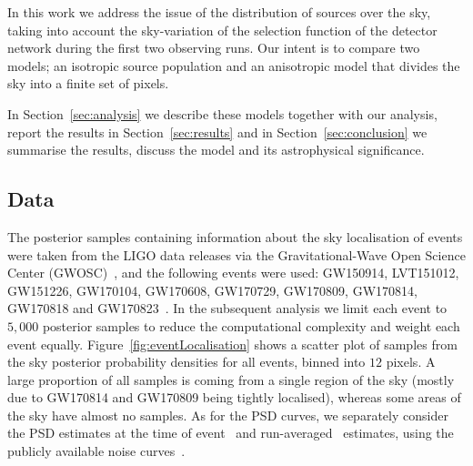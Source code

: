 \documentclass[usenatbib,useAMS]{mnras}
\begin{document}
In this work we address the issue of the distribution of sources over the sky,
taking into account the sky-variation of the selection function of the detector
network during the first two observing runs. Our intent is to compare two
models; an isotropic source population and an anisotropic model that divides the
sky into a finite set of pixels.

In Section~\ref{sec:analysis} we describe these
models together with our analysis, report the results in
Section~\ref{sec:results} and in Section~\ref{sec:conclusion} we summarise the
results, discuss the model and its astrophysical significance.

\subsection{Data}
The posterior samples containing information about the sky localisation of
events were taken from the LIGO data releases via the Gravitational-Wave Open
Science Center (GWOSC)~\citep{Vallisneri:2014vxa}, and the following events were
used: GW150914, LVT151012, GW151226, GW170104, GW170608, GW170729, GW170809,
GW170814, GW170818 and GW170823~\citep{O1O2catalog}. In the subsequent analysis
we limit each event to $5,000$ posterior samples to reduce the computational
complexity and weight each event equally. Figure~\ref{fig:eventLocalisation}
shows a scatter plot of samples from the sky posterior probability densities for
all events, binned into $12$ pixels. A large proportion of all samples is coming
from a single region of the sky (mostly due to GW170814 and GW170809 being
tightly localised), whereas some areas of the sky have almost no samples. As for
the \ac{PSD} curves, we separately consider the \ac{PSD} estimates at the time
of event~\citep{PSDevent} and run-averaged~\citep{PSDO1H1, PSDO1L1, PSDO2}
estimates, using the publicly available noise curves~\citep{O1O2catalog}.
\end{document}
